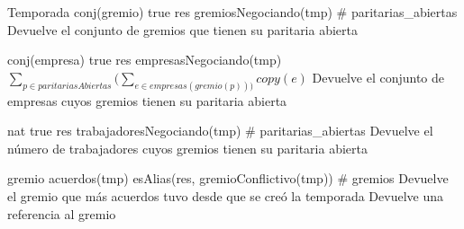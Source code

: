 \begin{interfaz}{Temporada}
{}{conj(gremio)}
{true}
{res \igobs gremiosNegociando(tmp)}
{\# paritarias\_abiertas}
{Devuelve el conjunto de gremios que tienen su paritaria abierta }
{}

{}{conj(empresa)}
{true}
{res \igobs empresasNegociando(tmp)}
{\ensuremath{\sum_{p \in paritariasAbiertas} (\sum_{e \in empresas(gremio(p)))} copy(e)}}
{Devuelve el conjunto de empresas cuyos gremios tienen su paritaria abierta}
{}

{}{nat}
{true}
{res \igobs trabajadoresNegociando(tmp)}
{\# paritarias\_abiertas}
{Devuelve el n\'umero de trabajadores cuyos gremios tienen su paritaria abierta}
{}

{}{gremio}
{\emptyset \neq acuerdos(tmp)}
{ esAlias(res, gremioConflictivo(tmp))}
{\# gremios}
{Devuelve el gremio que m\'as acuerdos tuvo desde que se cre\'o la temporada }
{Devuelve una referencia al gremio}


\end{interfaz}